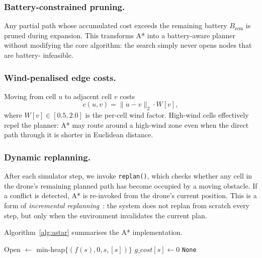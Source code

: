 \documentclass[11pt,twocolumn]{article}
\begin{document}
\subsubsection{Battery-constrained pruning.}
Any partial path whose accumulated cost exceeds the remaining battery
$B_{\text{rem}}$ is pruned during expansion.
This transforms A* into a battery-aware planner without modifying the
core algorithm: the search simply never opens nodes that are battery-
infeasible.

\subsubsection{Wind-penalised edge costs.}
Moving from cell $u$ to adjacent cell $v$ costs
\begin{equation}
    c(u, v) = \|u - v\|_2 \cdot W[v],
\end{equation}
where $W[v] \in [0.5, 2.0]$ is the per-cell wind factor.
High-wind cells effectively repel the planner: A* may route around a
high-wind zone even when the direct path through it is shorter in
Euclidean distance.

\subsubsection{Dynamic replanning.}
After each simulator step, we invoke \texttt{replan()}, which checks
whether any cell in the drone's remaining planned path has become
occupied by a moving obstacle.
If a conflict is detected, A* is re-invoked from the drone's current
position.
This is a form of \emph{incremental replanning}~\cite{likhachev2005}:
the system does not replan from scratch every step, but only when the
environment invalidates the current plan.

Algorithm~\ref{alg:astar} summarises the A* implementation.

\begin{algorithm}[H]
\small
\caption{A* with battery pruning and wind costs}
\label{alg:astar}
\SetAlgoLined
{}
Open $\leftarrow$ min-heap$\{(f(s), 0, s, [s])\}$\;
$g\_cost[s] \leftarrow 0$\;
\Return \texttt{None}\;
\end{algorithm}
\end{document}
